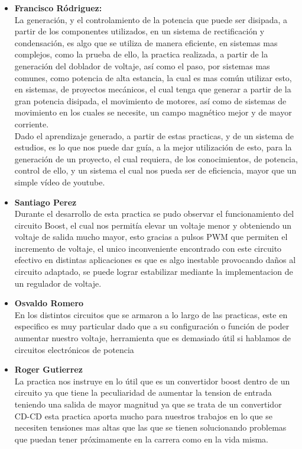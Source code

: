 \documentclass[12pt,letterpaper]{article}
\begin{document}
\begin{itemize}
\item \textbf{Francisco Ródriguez:}\\
La generación, y el controlamiento de la potencia que puede ser disipada, a partir de los componentes utilizados, en un sistema de rectificación y condensación, es algo que se utiliza de manera eficiente, en sistemas mas complejos, como la prueba de ello, la practica realizada, a partir de la generación del doblador de voltaje, así como el paso, por sistemas mas comunes, como potencia de alta estancia, la cual es mas común utilizar esto, en sistemas, de proyectos mecánicos, el cual tenga que generar a partir de la gran potencia disipada, el movimiento de motores, así como de sistemas de movimiento en los cuales se necesite, un campo magnético mejor y de mayor corriente.\\
Dado el aprendizaje generado, a partir de estas practicas, y de un sistema de estudios, es lo que nos puede dar guía, a la mejor utilización de esto, para la generación de un proyecto, el cual requiera, de los conocimientos, de potencia, control de ello, y un sistema el cual nos pueda ser de eficiencia, mayor que un simple vídeo de youtube.\\
\item \textbf{Santiago Perez}\\
Durante el desarrollo de esta practica se pudo observar el funcionamiento del circuito Boost, el cual nos permitía elevar un voltaje menor y obteniendo un voltaje de salida mucho mayor, esto gracias a pulsos PWM que permiten el incremento de voltaje, el unico inconveniente encontrado con este circuito efectivo en distintas aplicaciones es que es algo inestable provocando daños al circuito adaptado, se puede lograr estabilizar mediante la implementacion de un regulador de voltaje.
\item \textbf{Osvaldo Romero}\\
En los distintos circuitos que se armaron a lo largo de las practicas, este en especifico es muy particular dado que a su configuración o función de poder aumentar nuestro voltaje, herramienta que es demasiado útil si hablamos de circuitos electrónicos de potencia
\item \textbf{Roger Gutierrez}\\
La practica nos instruye en lo útil que es un convertidor boost dentro de un circuito ya que tiene la peculiaridad de aumentar la tension de entrada teniendo una salida de mayor magnitud ya que se trata de un convertidor CD-CD esta practica aporta mucho para nuestros trabajos en lo que se necesiten tensiones mas altas que las que se tienen solucionando problemas que puedan tener próximamente en la carrera como en la vida misma.

\end{itemize}
\end{document}
